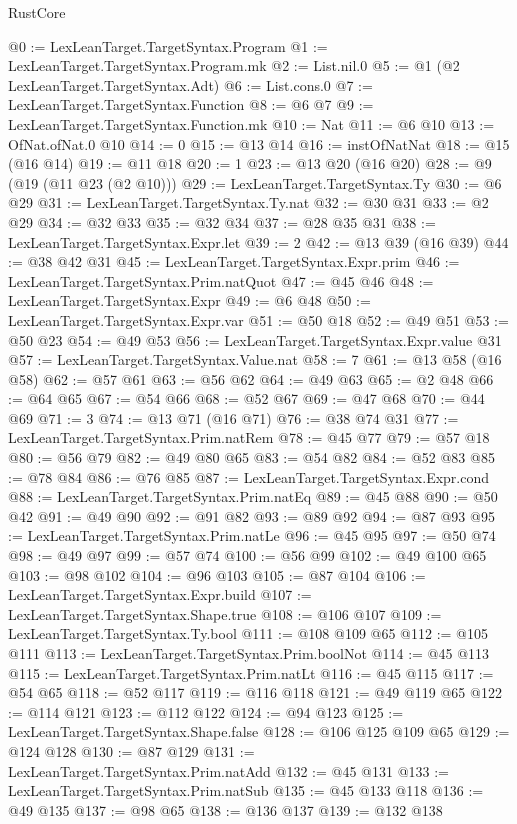 \begin{lexlean}{RustCore}
\begin{coremodule}
@0 := LexLeanTarget.TargetSyntax.Program
@1 := LexLeanTarget.TargetSyntax.Program.mk
@2 := List.nil.{0}
@5 := @1 (@2 LexLeanTarget.TargetSyntax.Adt)
@6 := List.cons.{0}
@7 := LexLeanTarget.TargetSyntax.Function
@8 := @6 @7
@9 := LexLeanTarget.TargetSyntax.Function.mk
@10 := Nat
@11 := @6 @10
@13 := OfNat.ofNat.{0} @10
@14 := 0
@15 := @13 @14
@16 := instOfNatNat
@18 := @15 (@16 @14)
@19 := @11 @18
@20 := 1
@23 := @13 @20 (@16 @20)
@28 := @9 (@19 (@11 @23 (@2 @10)))
@29 := LexLeanTarget.TargetSyntax.Ty
@30 := @6 @29
@31 := LexLeanTarget.TargetSyntax.Ty.nat
@32 := @30 @31
@33 := @2 @29
@34 := @32 @33
@35 := @32 @34
@37 := @28 @35 @31
@38 := LexLeanTarget.TargetSyntax.Expr.let
@39 := 2
@42 := @13 @39 (@16 @39)
@44 := @38 @42 @31
@45 := LexLeanTarget.TargetSyntax.Expr.prim
@46 := LexLeanTarget.TargetSyntax.Prim.natQuot
@47 := @45 @46
@48 := LexLeanTarget.TargetSyntax.Expr
@49 := @6 @48
@50 := LexLeanTarget.TargetSyntax.Expr.var
@51 := @50 @18
@52 := @49 @51
@53 := @50 @23
@54 := @49 @53
@56 := LexLeanTarget.TargetSyntax.Expr.value @31
@57 := LexLeanTarget.TargetSyntax.Value.nat
@58 := 7
@61 := @13 @58 (@16 @58)
@62 := @57 @61
@63 := @56 @62
@64 := @49 @63
@65 := @2 @48
@66 := @64 @65
@67 := @54 @66
@68 := @52 @67
@69 := @47 @68
@70 := @44 @69
@71 := 3
@74 := @13 @71 (@16 @71)
@76 := @38 @74 @31
@77 := LexLeanTarget.TargetSyntax.Prim.natRem
@78 := @45 @77
@79 := @57 @18
@80 := @56 @79
@82 := @49 @80 @65
@83 := @54 @82
@84 := @52 @83
@85 := @78 @84
@86 := @76 @85
@87 := LexLeanTarget.TargetSyntax.Expr.cond
@88 := LexLeanTarget.TargetSyntax.Prim.natEq
@89 := @45 @88
@90 := @50 @42
@91 := @49 @90
@92 := @91 @82
@93 := @89 @92
@94 := @87 @93
@95 := LexLeanTarget.TargetSyntax.Prim.natLe
@96 := @45 @95
@97 := @50 @74
@98 := @49 @97
@99 := @57 @74
@100 := @56 @99
@102 := @49 @100 @65
@103 := @98 @102
@104 := @96 @103
@105 := @87 @104
@106 := LexLeanTarget.TargetSyntax.Expr.build
@107 := LexLeanTarget.TargetSyntax.Shape.true
@108 := @106 @107
@109 := LexLeanTarget.TargetSyntax.Ty.bool
@111 := @108 @109 @65
@112 := @105 @111
@113 := LexLeanTarget.TargetSyntax.Prim.boolNot
@114 := @45 @113
@115 := LexLeanTarget.TargetSyntax.Prim.natLt
@116 := @45 @115
@117 := @54 @65
@118 := @52 @117
@119 := @116 @118
@121 := @49 @119 @65
@122 := @114 @121
@123 := @112 @122
@124 := @94 @123
@125 := LexLeanTarget.TargetSyntax.Shape.false
@128 := @106 @125 @109 @65
@129 := @124 @128
@130 := @87 @129
@131 := LexLeanTarget.TargetSyntax.Prim.natAdd
@132 := @45 @131
@133 := LexLeanTarget.TargetSyntax.Prim.natSub
@135 := @45 @133 @118
@136 := @49 @135
@137 := @98 @65
@138 := @136 @137
@139 := @132 @138

\end{coremodule}
\end{lexlean}
